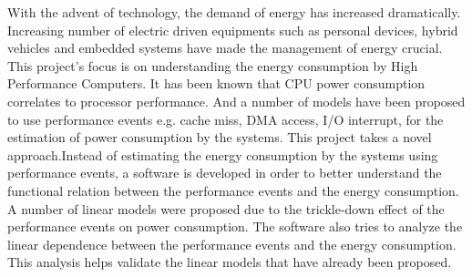With the advent of technology, the demand of energy has increased dramatically. Increasing number of electric driven equipments such as personal devices, hybrid vehicles and embedded systems have made the management of energy crucial. This project’s focus is on understanding the energy consumption by High Performance Computers. It has been known that CPU power consumption correlates to processor performance. And a number of models have been proposed to use performance events e.g. cache miss, DMA access, I/O interrupt, for the estimation of power consumption by the systems. This project takes a novel approach.Instead of estimating the energy consumption by the systems using performance events, a software is developed in order to better understand the functional relation between the performance events and the energy consumption. A number of linear models were proposed due to the trickle-down effect of the performance events on power consumption\cite{gilberto2005power}. The software also tries to analyze the linear dependence between the performance events and the energy consumption. This analysis helps validate the linear models that have already been proposed.